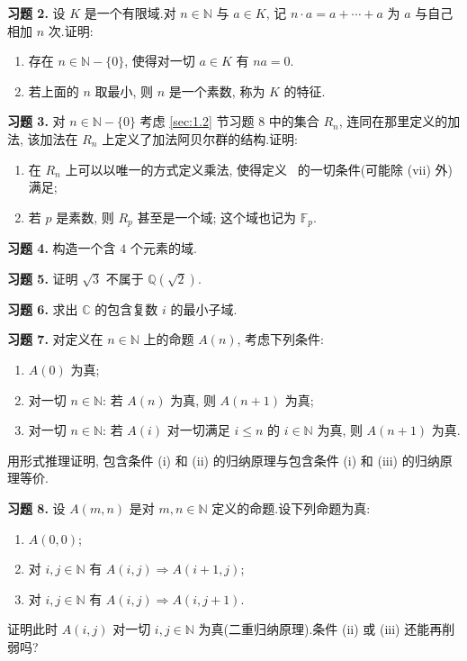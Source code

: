 \medskip
\noindent\textbf{习题 2.} 设 $K$ 是一个有限域.对 $n \in \mathbb{N}$ 与 $a \in K$, 记 $n \cdot a = a + \cdots + a$ 为 $a$ 与自己相加 $n$ 次.证明:
\begin{enumerate}
\item[(i)] 存在 $n \in \mathbb{N} - \{0\}$, 使得对一切 $a \in K$ 有 $na = 0$.
\item[(ii)] 若上面的 $n$ 取最小, 则 $n$ 是一个素数, 称为 $K$ 的特征.
\end{enumerate}

\medskip
\noindent\textbf{习题 3.} 对 $n \in \mathbb{N} - \{0\}$ 考虑 \ref{sec:1.2} 节习题 8 中的集合 $R_n$, 连同在那里定义的加法, 该加法在 $R_n$ 上定义了加法阿贝尔群的结构.证明:
\begin{enumerate}
\item[(i)] 在 $R_n$ 上可以以唯一的方式定义乘法, 使得定义~ 的一切条件(可能除 (vii) 外)满足;
\item[(ii)] 若 $p$ 是素数, 则 $R_p$ 甚至是一个域; 这个域也记为 $\mathbb{F}_p$.
\end{enumerate}

\medskip
\noindent\textbf{习题 4.} 构造一个含 $4$ 个元素的域.

\medskip
\noindent\textbf{习题 5.} 证明 $\sqrt{3}$ 不属于 $\mathbb{Q}(\sqrt{2})$.

\medskip
\noindent\textbf{习题 6.} 求出 $\mathbb{C}$ 的包含复数 $i$ 的最小子域.

\medskip
\noindent\textbf{习题 7.} 对定义在 $n \in \mathbb{N}$ 上的命题 $A(n)$, 考虑下列条件:
\begin{enumerate}
\item[(i)] $A(0)$ 为真;
\item[(ii)] 对一切 $n \in \mathbb{N}$: 若 $A(n)$ 为真, 则 $A(n + 1)$ 为真;
\item[(iii)] 对一切 $n \in \mathbb{N}$: 若 $A(i)$ 对一切满足 $i \leq n$ 的 $i \in \mathbb{N}$ 为真, 则 $A(n + 1)$ 为真.
\end{enumerate}
用形式推理证明, 包含条件 (i) 和 (ii) 的归纳原理与包含条件 (i) 和 (iii) 的归纳原理等价.

\medskip
\noindent\textbf{习题 8.} 设 $A(m, n)$ 是对 $m, n \in \mathbb{N}$ 定义的命题.设下列命题为真:
\begin{enumerate}
\item[(i)] $A(0, 0)$;
\item[(ii)] 对 $i, j \in \mathbb{N}$ 有 $A(i, j) \Longrightarrow A(i + 1, j)$;
\item[(iii)] 对 $i, j \in \mathbb{N}$ 有 $A(i, j) \Longrightarrow A(i, j + 1)$.
\end{enumerate}
证明此时 $A(i, j)$ 对一切 $i, j \in \mathbb{N}$ 为真(二重归纳原理).条件 (ii) 或 (iii) 还能再削弱吗?

